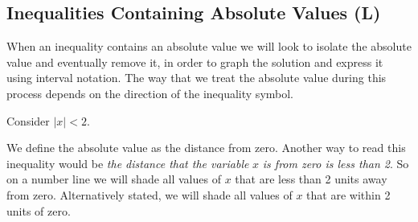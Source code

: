 \documentclass[12pt]{book}
\theoremstyle{definition}
\begin{document}
\subsection{Inequalities Containing Absolute Values (L)}
When an inequality contains an absolute value we will look to isolate the absolute value and eventually remove it, in order to graph the solution and express it using interval notation.  The way that we treat the absolute value during this process depends on the direction of the inequality symbol.\par
Consider $|x| < 2$.\par
We define the absolute value as the distance from zero.  Another way to read this inequality would be {\it the distance that the variable} $x$ {\it is from zero is less than 2}. So on a number line we will shade all values of $x$ that are less than 2 units away from zero.  Alternatively stated, we will shade all values of $x$ that are within 2 units of zero.
\end{document}
